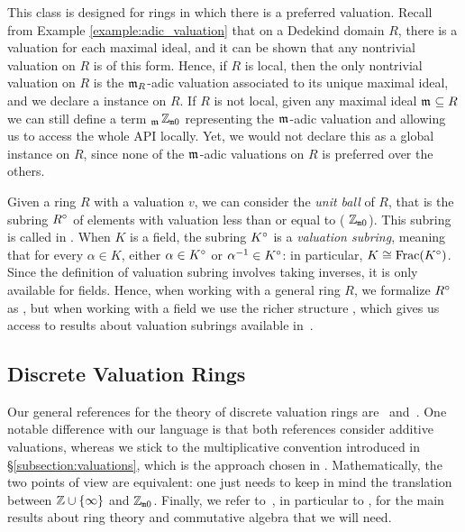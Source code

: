 \documentclass[sigplan,screen]{acmart}
\begin{document}
This class is designed for rings in which there is a preferred valuation. Recall from Example \ref{example:adic_valuation} that 
on a Dedekind domain $R$, there is a valuation for each maximal ideal, and it can be shown that any nontrivial valuation on $R$ is of this form. Hence, if $R$ is local, then the only nontrivial valuation on $R$ is the  $\mathfrak{m}_{R}$-adic valuation associated to its unique maximal ideal, and we declare a  instance on $R$. If $R$ is not local, given any maximal ideal $\maxid[\empty]\subseteq R$  we can still define a term $_{\maxid[\empty]}$\;$\mathbb{Z}_{\mathtt{m}0}$\code{)} representing the $\maxid[\empty]$-adic valuation and allowing us to access the whole  API locally. Yet, we would not declare this as a global  instance on $R$, since none of the $\maxid[\empty]$-adic valuations on $R$ is preferred over the others.

Given a ring $R$ with a valuation $v$, we can consider the \textit{unit ball} of $R$, that is the subring ${R}^\circ$ of elements with valuation less than or equal to ( $\mathbb{Z}_{\mathtt{m}0}$). This subring is called \href{https://leanprover-community.github.io/mathlib_docs/ring_theory/valuation/integers.html#valuation.integer}{\extlink} in \mathlib. 
When $K$ is a field, the subring ${K}^\circ$ is a \emph{valuation subring}, meaning that for every $\alpha\in K$, either $\alpha \in {K}^\circ$ or $\alpha^{-1} \in {K}^\circ$: in particular, $K\cong\operatorname{Frac}({K}^\circ)$. Since the definition of valuation subring involves taking inverses, it is only available for fields. Hence, when working with a general ring $R$, we formalize ${R}^\circ$ as , but when working with a field we use the richer structure \href{https://leanprover-community.github.io/mathlib_docs/ring_theory/valuation/valuation_subring.html#valuation_subring}{\extlink}, which gives us access to results about valuation subrings available in~\mathlib. 

\subsection{Discrete Valuation Rings}\label{subsection:def_dvr}

Our general references for the theory of discrete valuation rings are~\cite[Chapitres~I--II]{Ser62} and~\cite[Chapitre~VI]{Bou85}. One notable difference with our language is that both references consider additive valuations, whereas we stick to the multiplicative convention introduced in \S\ref{subsection:valuations}, which is the approach chosen in \mathlib. 
Mathematically, the two points of view are equivalent: one just needs to keep in mind the translation between $\mathbb{Z} \cup \{\infty\}$ and $\mathbb{Z}_{\mathtt{m}0}$. Finally, we refer to~\cite{Bou07}, in particular to \cite[Chapitre~IV]{Bou07}, for the main results about ring theory and commutative algebra that we will need.
\end{document}
